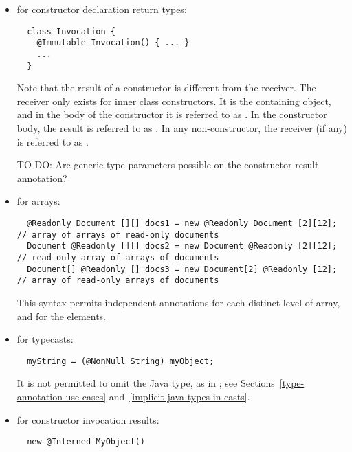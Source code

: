 \documentclass[10pt]{article}
\begin{document}
\begin{itemize}
\item for constructor declaration return types:

\preverbnegspace
\begin{Verbatim}
  class Invocation {
    @Immutable Invocation() { ... }
    ...
  }
\end{Verbatim}
\preverbnegspace

Note that the result of a constructor is different from the receiver.  The
receiver only exists for inner class constructors.  It is the containing
object, and in the body of the constructor it is referred to as
.  In the constructor body, the result is referred to as
.  In any non-constructor, the receiver (if any) is referred to
as .

TO DO:  Are generic type parameters possible on the constructor result
annotation?


\item for arrays:
\preverbnegspace
\begin{Verbatim}
  @Readonly Document [][] docs1 = new @Readonly Document [2][12]; // array of arrays of read-only documents
  Document @Readonly [][] docs2 = new Document @Readonly [2][12]; // read-only array of arrays of documents
  Document[] @Readonly [] docs3 = new Document[2] @Readonly [12]; // array of read-only arrays of documents
\end{Verbatim}

\preverbnegspace
This syntax permits independent annotations for each distinct level of
array, and for the elements.


\item for typecasts:
\preverbnegspace
\begin{Verbatim}
  myString = (@NonNull String) myObject;
\end{Verbatim}
\preverbnegspace
It is not permitted to omit the Java type, as in
; see
Sections~\ref{type-annotation-use-cases} and~\ref{implicit-java-types-in-casts}.

\item for constructor invocation results:

\preverbnegspace
\begin{Verbatim}
  new @Interned MyObject()
\end{Verbatim}
\preverbnegspace


\end{itemize}
\end{document}

